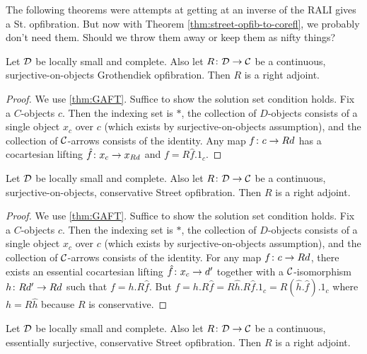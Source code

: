 \documentclass{amsart}
\begin{document}
{\daniel The following theorems were attempts at
  getting at an inverse of the RALI gives a
  St. opfibration.  But now with Theorem
  \ref{thm:street-opfib-to-corefl}, we probably
  don't need them.  Should we throw them away or
  keep them as nifty things?}

\begin{thm}
	Let $ \mathcal{D}$ be locally small and complete. Also let $ R \colon \mathcal{D} \to \mathcal{C} $ be a continuous, surjective-on-objects Grothendiek opfibration.  Then $ R $ is a right adjoint.
\end{thm}

\begin{proof}
	We use \ref{thm:GAFT}.  Suffice to show the solution set condition holds.  Fix a $ C $-objects $ c $.  Then the indexing set is $ \ast $, the collection of $ D $-objects consists of a single object $ x_c $ over $ c $ (which exists by surjective-on-objects assumption), and the collection of $ \mathcal{C} $-arrows consists of the identity.  Any map $ f \colon c \to Rd $ has a cocartesian lifting $ \hat{f} \colon x_c \to x_{Rd} $ and $ f = R \hat{f} . 1_c $.
\end{proof}

\begin{thm}
	Let $ \mathcal{D}$ be locally small and complete. Also let $ R \colon \mathcal{D} \to \mathcal{C} $ be a continuous, surjective-on-objects, conservative Street opfibration.  Then $ R $ is a right adjoint.
\end{thm}

\begin{proof}
	We use \ref{thm:GAFT}.  Suffice to show the solution set condition holds.  Fix a $ C $-objects $ c $.  Then the indexing set is $ \ast $, the collection of $ D $-objects consists of a single object $ x_c $ over $ c $ (which exists by surjective-on-objects assumption), and the collection of $ \mathcal{C} $-arrows consists of the identity.  For any map $ f \colon c \to Rd $, there exists an essential cocartesian lifting $ \hat{f} \colon x_c \to d' $ together with a $ \mathcal{C} $-isomorphism $ h \colon Rd' \to Rd $ such that $ f = h . R \hat{f} $. But $ f = h . R \hat{f} = R \hat{h} . R \hat{f} . 1_c = R (\hat{h} . \hat{f}) . 1_c $ where $ h = R \hat{h} $ because $ R $ is conservative.
\end{proof}

\begin{thm}
	Let $ \mathcal{D}$ be locally small and complete. Also let $ R \colon \mathcal{D} \to \mathcal{C} $ be a continuous, essentially surjective, conservative Street opfibration.  Then $ R $ is a right adjoint.
\end{thm}
\end{document}
